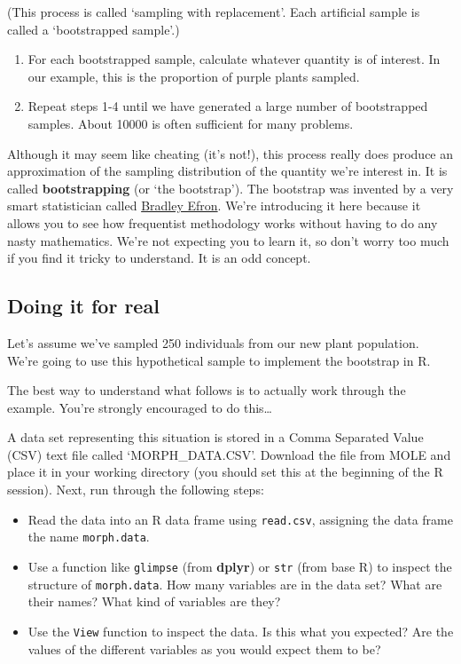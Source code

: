 \documentclass[]{book}
\begin{document}
(This process is called `sampling with replacement'. Each artificial
sample is called a `bootstrapped sample'.)

\begin{enumerate}
\def\labelenumi{\arabic{enumi}.}
\setcounter{enumi}{3}
\item
  For each bootstrapped sample, calculate whatever quantity is of
  interest. In our example, this is the proportion of purple plants
  sampled.
\item
  Repeat steps 1-4 until we have generated a large number of
  bootstrapped samples. About 10000 is often sufficient for many
  problems.
\end{enumerate}

Although it may seem like cheating (it's not!), this process really does
produce an approximation of the sampling distribution of the quantity
we're interest in. It is called \textbf{bootstrapping} (or `the
bootstrap'). The bootstrap was invented by a very smart statistician
called \href{https://en.wikipedia.org/wiki/Bradley_Efron}{Bradley
Efron}. We're introducing it here because it allows you to see how
frequentist methodology works without having to do any nasty
mathematics. We're not expecting you to learn it, so don't worry too
much if you find it tricky to understand. It is an odd concept.

\subsection{Doing it for real}\label{doing-it-for-real}

Let's assume we've sampled 250 individuals from our new plant
population. We're going to use this hypothetical sample to implement the
bootstrap in R.

\begin{do-something}
The best way to understand what follows is to actually work through the
example. You're strongly encouraged to do this\ldots{}
\end{do-something}

A data set representing this situation is stored in a Comma Separated
Value (CSV) text file called `MORPH\_DATA.CSV'. Download the file from
MOLE and place it in your working directory (you should set this at the
beginning of the R session). Next, run through the following steps:

\begin{itemize}
\item
  Read the data into an R data frame using \texttt{read.csv}, assigning
  the data frame the name \texttt{morph.data}.
\item
  Use a function like \texttt{glimpse} (from \textbf{dplyr}) or
  \texttt{str} (from base R) to inspect the structure of
  \texttt{morph.data}. How many variables are in the data set? What are
  their names? What kind of variables are they?
\item
  Use the \texttt{View} function to inspect the data. Is this what you
  expected? Are the values of the different variables as you would
  expect them to be?
\end{itemize}
\end{document}
